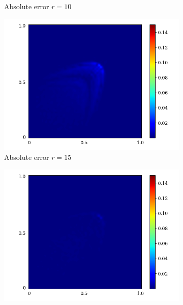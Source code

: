 \begin{figure}[!htb]
\begin{center}
\begin{subfigure}[b]{0.23\textwidth}
\begin{center}
             \end{center}
             \caption{Absolute error $r = 10$}
         \end{subfigure}   
         \begin{subfigure}[b]{0.23\textwidth}
             \begin{center}
                \includegraphics[trim = {0, 0, 3cm, 0}, clip, width=\textwidth]{Pictures/X-rom-LE-CNNAE-15-abs-err.png}
             \end{center}
             \caption{Absolute error $r = 15$}
         \end{subfigure}    
         \begin{subfigure}[b]{0.23\textwidth}
             \begin{center}
                \includegraphics[trim = {0, 0, 3cm, 0}, clip, width=\textwidth]{Pictures/X-rom-LE-CNNAE-20-abs-err.png}

\end{center}
\end{subfigure}
\end{center}
\end{figure}

